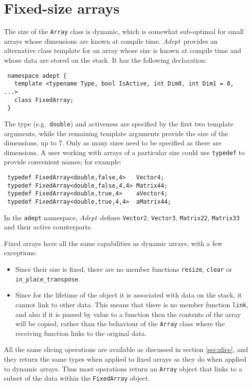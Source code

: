 \documentclass[a4,oneside]{book}
\def\codesize{\small}
\def\Adept{\emph{Adept}}
\def\code#1{{\codesize\texttt{#1}}}
\begin{document}
\section{Fixed-size arrays}
\label{sec:fixed}
The size of the \code{Array} class is dynamic, which is somewhat
sub-optimal for small arrays whose dimensions are known at compile
time. \Adept\ provides an alternative class template for an array
whose size is known at compile time and whose data are stored on the
stack. It has the following declaration:
\begin{lstlisting}
 namespace adept {
   template <typename Type, bool IsActive, int Dim0, int Dim1 = 0, ...>
   class FixedArray;
 }
\end{lstlisting}
The type (e.g.\ \code{double}) and activeness are specified by the
first two template arguments, while the remaining template arguments
provide the size of the dimensions, up to 7.  Only as many sizes need
to be specified as there are dimensions.  A user working with arrays
of a particular size could use \code{typedef} to provide convenient
names; for example:
\begin{lstlisting}
 typedef FixedArray<double,false,4>   Vector4;
 typedef FixedArray<double,false,4,4> Matrix44;
 typedef FixedArray<double,true,4>    aVector4;
 typedef FixedArray<double,true,4,4>  aMatrix44;
\end{lstlisting}
In the \code{adept} namespace, \Adept\ defines \code{Vector2},
\code{Vector3}, \code{Matrix22}, \code{Matrix33} and their active
counterparts.

Fixed arrays have all the same capabilities as dynamic arrays, with a
few exceptions:
\begin{itemize}
\item Since their size is fixed, there are no member functions
  \code{resize}, \code{clear} or \code{in\_place\_transpose}.
\item Since for the lifetime of the object it is associated with data
  on the stack, it cannot link to other data.  This means that there
  is no member function \code{link}, and also if it is passed by value
  to a function then the contents of the array will be copied, rather
  than the behaviour of the \code{Array} class where the receiving
  function links to the original data.
\end{itemize}
All the same slicing operations are available as discussed in section
\ref{sec:slice}, and they return the same types when applied to fixed
arrays as they do when applied to dynamic arrays.  Thus most
operations return an \code{Array} object that links to a subset of the
data within the \code{FixedArray} object.
\end{document}
